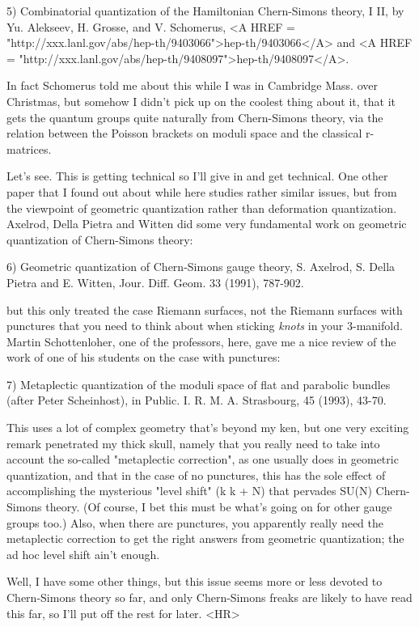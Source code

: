 5) Combinatorial quantization of the Hamiltonian Chern-Simons theory,
I \text{\&}  II, by Yu. Alekseev, H. Grosse, and V. Schomerus, <A HREF = "http://xxx.lanl.gov/abs/hep-th/9403066">hep-th/9403066</A>
and <A HREF = "http://xxx.lanl.gov/abs/hep-th/9408097">hep-th/9408097</A>.  

In fact Schomerus told me about this while I was in Cambridge Mass.
over Christmas, but somehow I didn't pick up on the coolest thing about it, 
that it gets the quantum groups quite naturally from Chern-Simons theory,
via the relation between the Poisson brackets on moduli space and
the classical r-matrices.

Let's see.  This is getting technical so I'll give in and get
technical.  One other paper that I found out about while here studies
rather similar issues, but from the viewpoint of geometric
quantization rather than deformation quantization.  Axelrod, Della Pietra and
Witten did some very fundamental work on geometric quantization of
Chern-Simons theory:

6) Geometric quantization of Chern-Simons gauge theory, S. Axelrod,
S. Della Pietra and E. Witten, Jour. Diff. Geom. 33 (1991), 787-902.

but this only treated the case Riemann surfaces, not the Riemann
surfaces with punctures that you need to think about when sticking
\emph{knots} in your 3-manifold.  Martin Schottenloher, one of the professors,
here, gave me a nice review of the work of one of his students on the
case with punctures:

7) Metaplectic quantization of the moduli space of flat and parabolic
bundles (after Peter Scheinhost), in Public. I. R. M. A. Strasbourg,
45 (1993), 43-70.

This uses a lot of complex geometry that's beyond my ken, but one
very exciting remark penetrated my thick skull, namely that you
really need to take into account the so-called "metaplectic correction", 
as one usually does in geometric quantization, and that in the case
of no punctures, this has the sole effect of accomplishing the
mysterious "level shift" (k \to  k + N) that pervades SU(N) Chern-Simons
theory.  (Of course, I bet this must be what's going on for other gauge
groups too.)  Also, when there are punctures, you apparently really need
the metaplectic correction to get the right answers from geometric
quantization; the ad hoc level shift ain't enough.

Well, I have some other things, but this issue seems more or less
devoted to Chern-Simons theory so far, and only Chern-Simons freaks
are likely to have read this far, so I'll put off the rest for later.
<HR>



